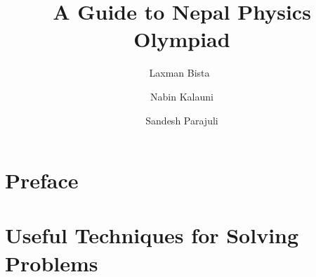 \documentclass[a4paper, 12pt, twoside]{book}
\begin{document}
% 
\frontmatter
\pagestyle{empty}
\title{\textbf{A Guide to Nepal Physics Olympiad}}
\author{
   Laxman Bista\
   \and
   Nabin Kalauni\\
   \and
   Sandesh Parajuli\\
}
\date{}
\maketitle



\pagestyle{plain}
\chapter*{Preface}
\clearpage
\chapter{Useful Techniques for Solving Problems}
\clearpage
\tableofcontents
\mainmatter








% 
\end{document}
